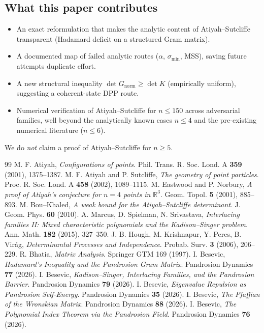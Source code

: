 \documentclass[11pt,a4paper]{article}
\begin{document}
\subsection{What this paper contributes}

\begin{itemize}
\item An exact reformulation that makes the analytic content of
Atiyah--Sutcliffe transparent (Hadamard deficit on a structured Gram matrix).
\item A documented map of failed analytic routes ($\alpha$, $\sigma_{\min}$, MSS),
saving future attempts duplicate effort.
\item A new structural inequality
$\det G_{\mathrm{norm}} \ge \det K$ (empirically uniform),
suggesting a coherent-state DPP route.
\item Numerical verification of Atiyah--Sutcliffe for $n \le 150$ across
adversarial families, well beyond the analytically known cases $n \le 4$ and
the pre-existing numerical literature ($n \le 6$).
\end{itemize}

We do \emph{not} claim a proof of Atiyah--Sutcliffe for $n \ge 5$.

\begin{thebibliography}{99}
 M. F. Atiyah, \textit{Configurations of points}.
Phil. Trans. R. Soc. Lond. A \textbf{359} (2001), 1375--1387.
 M. F. Atiyah and P. Sutcliffe,
\textit{The geometry of point particles}. Proc. R. Soc. Lond. A \textbf{458}
(2002), 1089--1115.
 M. Eastwood and P. Norbury,
\textit{A proof of Atiyah's conjecture for $n = 4$ points in $\mathbb R^3$}.
Geom. Topol. \textbf{5} (2001), 885--893.
 M. Bou--Khaled, \textit{A weak bound for the Atiyah--Sutcliffe
determinant}. J. Geom. Phys. \textbf{60} (2010).
 A. Marcus, D. Spielman, N. Srivastava, \textit{Interlacing
families II: Mixed characteristic polynomials and the Kadison--Singer problem}.
Ann. Math. \textbf{182} (2015), 327--350.
 J. B. Hough, M. Krishnapur, Y. Peres, B. Vir\'ag,
\textit{Determinantal Processes and Independence}. Probab. Surv.
\textbf{3} (2006), 206--229.
 R. Bhatia, \textit{Matrix Analysis}. Springer GTM 169 (1997).
 I. Besevic, \textit{Hadamard's Inequality and the
Pandrosion Gram Matrix}. Pandrosion Dynamics \textbf{77} (2026).
 I. Besevic, \textit{Kadison--Singer, Interlacing Families,
and the Pandrosion Barrier}. Pandrosion Dynamics \textbf{79} (2026).
 I. Besevic, \textit{Eigenvalue Repulsion as Pandrosion
Self-Energy}. Pandrosion Dynamics \textbf{35} (2026).
 I. Besevic, \textit{The Pfaffian of the Wronskian Matrix}.
Pandrosion Dynamics \textbf{88} (2026).
 I. Besevic, \textit{The Polynomial Index Theorem via the
Pandrosion Field}. Pandrosion Dynamics \textbf{76} (2026).
\end{thebibliography}
\end{document}
